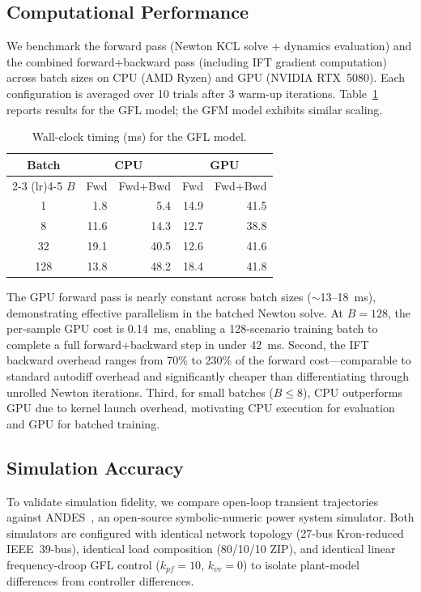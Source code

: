 \documentclass[11pt]{article}
\begin{document}
\subsection{Computational Performance}
\label{sec:compute}

We benchmark the forward pass (Newton KCL solve + dynamics evaluation)
and the combined forward+backward pass (including IFT gradient
computation) across batch sizes on CPU (AMD Ryzen) and GPU (NVIDIA
RTX~5080).  Each configuration is averaged over 10 trials after 3
warm-up iterations.  Table~\ref{tab:compute} reports results for the
GFL model; the GFM model exhibits similar scaling.

\begin{table}[t]
\centering
\caption{Wall-clock timing (ms) for the GFL model.}
\label{tab:compute}
\small
\begin{tabular}{crrrr}
\toprule
\textbf{Batch} & \multicolumn{2}{c}{\textbf{CPU}} & \multicolumn{2}{c}{\textbf{GPU}} \\
\cmidrule(lr){2-3} \cmidrule(lr){4-5}
$B$ & Fwd & Fwd+Bwd & Fwd & Fwd+Bwd \\
\midrule
  1   &  1.8 &   5.4 &  14.9 &  41.5 \\
  8   & 11.6 &  14.3 &  12.7 &  38.8 \\
  32  & 19.1 &  40.5 &  12.6 &  41.6 \\
 128  & 13.8 &  48.2 &  18.4 &  41.8 \\
\bottomrule
\end{tabular}
\end{table}

The GPU forward pass is
nearly constant across batch sizes ($\sim$13--18~ms), demonstrating
effective parallelism in the batched Newton solve.  At $B = 128$,
the per-sample GPU cost is 0.14~ms, enabling a 128-scenario
training batch to complete a full forward+backward step in under
42~ms.  Second, the IFT backward overhead ranges from 70\% to
230\% of the forward cost---comparable to standard autodiff overhead
and significantly cheaper than differentiating through unrolled
Newton iterations.  Third, for small batches ($B \le 8$), CPU
outperforms GPU due to kernel launch overhead, motivating CPU
execution for evaluation and GPU for batched training.

\subsection{Simulation Accuracy}
\label{sec:andes}

To validate simulation fidelity, we compare open-loop transient
trajectories against ANDES~\cite{Cui21ANDES}, an open-source
symbolic-numeric power system simulator.  Both simulators are configured
with identical network topology (27-bus Kron-reduced IEEE~39-bus),
identical load composition (80/10/10 ZIP), and identical linear
frequency-droop GFL control ($k_{pf} = 10$, $k_{vv} = 0$) to isolate
plant-model differences from controller differences.
\end{document}

